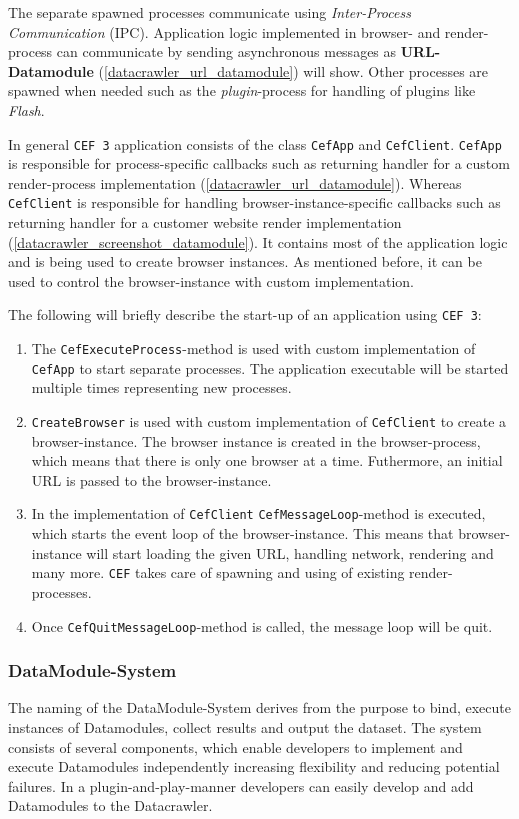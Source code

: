 The separate spawned processes communicate using \textit{Inter-Process Communication} (IPC). Application logic implemented in browser- and render-process can communicate by sending asynchronous messages as \textbf{URL-Datamodule} (\ref{datacrawler_url_datamodule})  will show. Other processes are spawned when needed such as the \textit{plugin}-process for handling of plugins like \textit{Flash}.

In general \texttt{CEF 3} application consists of the class \texttt{CefApp} and \texttt{CefClient}. \texttt{CefApp} is responsible for process-specific callbacks such as returning handler for a custom render-process implementation (\ref{datacrawler_url_datamodule}). Whereas \texttt{CefClient} is responsible for handling browser-instance-specific callbacks such as returning handler for a customer website render implementation (\ref{datacrawler_screenshot_datamodule}). It contains most of the application logic and is being used to create browser instances. As mentioned before, it can be used to control the browser-instance with custom implementation.

The following will briefly describe the start-up of an application using \texttt{CEF 3}:
\begin{enumerate}
	\item The \texttt{CefExecuteProcess}-method is used with custom implementation of \texttt{CefApp} to start separate processes. The application executable will be started multiple times representing new processes.
	\item \texttt{CreateBrowser} is used with custom implementation of \texttt{CefClient} to create a browser-instance. The browser instance is created in the browser-process, which means that there is only one browser at a time. Futhermore, an initial URL is passed to the browser-instance.
	\item In the implementation of \texttt{CefClient} \texttt{CefMessageLoop}-method is executed, which starts the event loop of the browser-instance. This means that browser-instance will start loading the given URL, handling network, rendering and many more. \texttt{CEF} takes care of spawning and using of existing render-processes.
	\item Once \texttt{CefQuitMessageLoop}-method is called, the message loop will be quit.
\end{enumerate}

\subsubsection{DataModule-System}
\label{datacrawler_datamodulesystem}
The naming of the DataModule-System derives from the purpose to bind, execute instances of Datamodules, collect results and output the dataset. The system consists of several components, which enable developers to implement and execute Datamodules independently increasing flexibility and reducing potential failures. In a plugin-and-play-manner developers can easily develop and add Datamodules to the Datacrawler.


